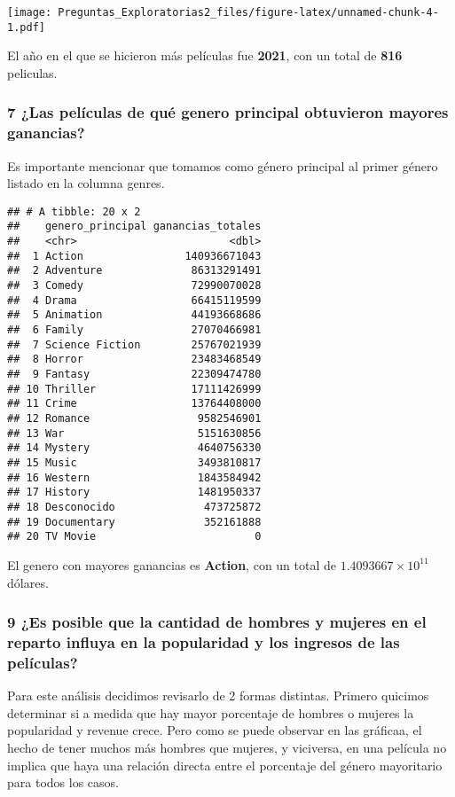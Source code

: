 \documentclass[
]{article}
\begin{document}
\texttt{[image: Preguntas\_Exploratorias2\_files/figure-latex/unnamed-chunk-4-1.pdf]}

El año en el que se hicieron más películas fue \textbf{2021}, con un
total de \textbf{816} peliculas.

\subsubsection{7 ¿Las películas de qué genero principal obtuvieron
mayores
ganancias?}\label{las-peluxedculas-de-quuxe9-genero-principal-obtuvieron-mayores-ganancias}

Es importante mencionar que tomamos como género principal al primer
género listado en la columna genres.

\begin{verbatim}
## # A tibble: 20 x 2
##    genero_principal ganancias_totales
##    <chr>                        <dbl>
##  1 Action                140936671043
##  2 Adventure              86313291491
##  3 Comedy                 72990070028
##  4 Drama                  66415119599
##  5 Animation              44193668686
##  6 Family                 27070466981
##  7 Science Fiction        25767021939
##  8 Horror                 23483468549
##  9 Fantasy                22309474780
## 10 Thriller               17111426999
## 11 Crime                  13764408000
## 12 Romance                 9582546901
## 13 War                     5151630856
## 14 Mystery                 4640756330
## 15 Music                   3493810817
## 16 Western                 1843584942
## 17 History                 1481950337
## 18 Desconocido              473725872
## 19 Documentary              352161888
## 20 TV Movie                         0
\end{verbatim}

El genero con mayores ganancias es \textbf{Action}, con un total de
\textbf{\ensuremath{1.4093667\times 10^{11}}} dólares.

\subsubsection{9 ¿Es posible que la cantidad de hombres y mujeres en el
reparto influya en la popularidad y los ingresos de las
películas?}\label{es-posible-que-la-cantidad-de-hombres-y-mujeres-en-el-reparto-influya-en-la-popularidad-y-los-ingresos-de-las-peluxedculas}

Para este análisis decidimos revisarlo de 2 formas distintas. Primero
quicimos determinar si a medida que hay mayor porcentaje de hombres o
mujeres la popularidad y revenue crece. Pero como se puede observar en
las gráficaa, el hecho de tener muchos más hombres que mujeres, y
viciversa, en una película no implica que haya una relación directa
entre el porcentaje del género mayoritario para todos los casos.
\end{document}
